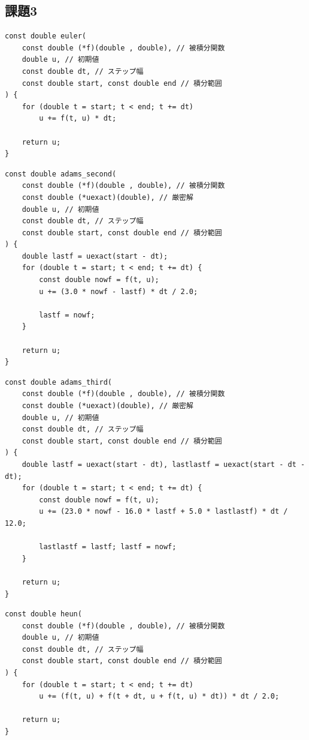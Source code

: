 \documentclass[a4j, titlepage]{jsarticle}
\numberwithin{equation}{section}
\begin{document}
    \subsection{課題3}
        \begin{lstlisting}[caption=前進オイラー法]
const double euler(
    const double (*f)(double , double), // 被積分関数
    double u, // 初期値
    const double dt, // ステップ幅
    const double start, const double end // 積分範囲
) {
    for (double t = start; t < end; t += dt)
        u += f(t, u) * dt;

    return u;
}
        \end{lstlisting}
        \begin{lstlisting}[caption=2次アダムス・バッシュフォース法]
const double adams_second(
    const double (*f)(double , double), // 被積分関数
    const double (*uexact)(double), // 厳密解
    double u, // 初期値
    const double dt, // ステップ幅
    const double start, const double end // 積分範囲
) {
    double lastf = uexact(start - dt);
    for (double t = start; t < end; t += dt) {
        const double nowf = f(t, u);
        u += (3.0 * nowf - lastf) * dt / 2.0;

        lastf = nowf;
    }

    return u;
}
        \end{lstlisting}
        \begin{lstlisting}[caption=3次アダムス・バッシュフォース法]
const double adams_third(
    const double (*f)(double , double), // 被積分関数
    const double (*uexact)(double), // 厳密解
    double u, // 初期値
    const double dt, // ステップ幅
    const double start, const double end // 積分範囲
) {
    double lastf = uexact(start - dt), lastlastf = uexact(start - dt - dt);
    for (double t = start; t < end; t += dt) {
        const double nowf = f(t, u);
        u += (23.0 * nowf - 16.0 * lastf + 5.0 * lastlastf) * dt / 12.0;

        lastlastf = lastf; lastf = nowf;
    }

    return u;
}
        \end{lstlisting}
        \begin{lstlisting}[caption=ホイン法, label=src:heun]
const double heun(
    const double (*f)(double , double), // 被積分関数
    double u, // 初期値
    const double dt, // ステップ幅
    const double start, const double end // 積分範囲
) {
    for (double t = start; t < end; t += dt)
        u += (f(t, u) + f(t + dt, u + f(t, u) * dt)) * dt / 2.0;

    return u;
}
        \end{lstlisting}
\end{document}
